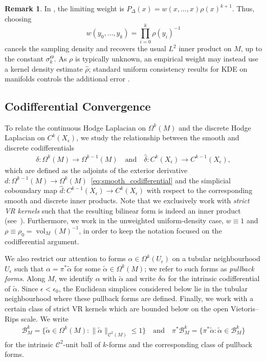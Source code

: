 \documentclass[11pt,reqno]{amsproc}
\numberwithin{equation}{section}
\newcommand{\cB}{\mathcal{B}}
\newcommand{\cC}{\mathcal{C}}
\newcommand{\talpha}{\tilde{\alpha}}
\newcommand{\hd}{\hat{d}}
\newcommand{\hdelta}{\hat{\delta}}
\newcommand{\hrho}{\hat{\rho}}
\newcommand{\vol}{\operatorname{vol}}
\newcommand{\andd}{\quad \text{and} \quad}
\theoremstyle{definition}
\newtheorem{remark}[counter]{Remark}
\theoremstyle{plain}
\begin{document}
    \begin{remark}
        In , the limiting weight is $P_\Delta(x)=w(x,\ldots,x)\rho(x)^{k+1}$. Thus, choosing
        \[
            w(y_0,\ldots,y_k)=\prod_{i=0}^k \rho(y_i)^{-1}
        \]
        cancels the sampling density and recovers the usual $L^2$ inner product on $M$, up to the constant $\sigma^\Theta_k$. As $\rho$ is typically unknown, an empirical weight may instead use a kernel density estimate $\hrho$;  standard uniform consistency results for KDE on manifolds controls the additional error \cite{coifman_diffusion_2006}.
    \end{remark}




    \subsection{Codifferential Convergence}
    \label{not:discrete_codifferential}
    To relate the continuous Hodge Laplacian on $\Omega^k(M)$ and the discrete Hodge Laplacian on $C^k(X_\epsilon)$, we study the relationship between the smooth and discrete codifferentials
    \begin{align}
        \delta: \Omega^k(M) \to \Omega^{k-1}(M) \andd \hdelta: C^k(X_\epsilon) \to C^{k-1}(X_\epsilon),
    \end{align}
    which are defined as the adjoints of the exterior derivative $d: \Omega^{k-1}(M) \to \Omega^k(M)$~\eqref{eq:smooth_codifferential} and the simplicial coboundary map $\hd: C^{k-1}(X_\epsilon) \to C^k(X_\epsilon)$ with respect to the corresponding smooth and discrete inner products. Note that we exclusively work with \emph{strict VR kernels} such that the resulting bilinear form is indeed an inner product (see~). Furthermore, we work in the unweighted uniform-density case, $w \equiv 1$ and $\rho \equiv \rho_0=\vol_M(M)^{-1}$, in order to keep the notation focused on the codifferential argument.

    We also restrict our attention to forms $\alpha \in \Omega^k(U_\epsilon)$ on a tubular neighbourhood $U_\epsilon$ such that $\alpha = \pi^* \talpha$ for some $\talpha \in \Omega^k(M)$; we refer to such forms as \emph{pullback forms}. Along $M$, we identify $\alpha$ with $\talpha$ and write $\delta\alpha$ for the intrinsic codifferential of $\talpha$. Since $\epsilon<\epsilon_0$, the Euclidean simplices considered below lie in the tubular neighbourhood where these pullback forms are defined. Finally, we work with a certain class of strict VR kernels which are bounded below on the open Vietoris--Rips scale. \label{not:uniform_pullback_setting}
    We write
    \begin{align} \label{not:intrinsic_pullback_unit_balls}
        \cB_M^k = \{\talpha \in \Omega^k(M): \|\talpha\|_{\cC^2(M)}\leq 1\} \andd \pi^*\cB_M^k = \{\pi^*\talpha: \talpha\in \cB_M^k\}
    \end{align}
    for the intrinsic $\cC^2$-unit ball of $k$-forms and the corresponding class of pullback forms.
\end{document}
